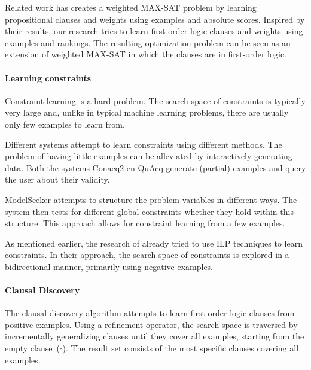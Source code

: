 \documentclass[letterpaper]{article}
\theoremstyle{definition}
\begin{document}
Related work \cite{campigotto2011active} has creates a weighted MAX-SAT problem by learning propositional clauses and weights using examples and absolute scores.
Inspired by their results, our research tries to learn first-order logic clauses and weights using examples and rankings.
The resulting optimization problem can be seen as an extension of weighted MAX-SAT in which the clauses are in first-order logic.

\paragraph{Learning constraints}
Constraint learning is a hard problem.
The search space of constraints is typically very large and, unlike in typical machine learning problems, there are usually only few examples to learn from.

Different systems attempt to learn constraints using different methods.
The problem of having little examples can be alleviated by interactively generating data.
Both the systems Conacq2 \cite{bessiere2007query} en QuAcq \cite{bessiere2013constraint} generate (partial) examples and query the user about their validity.

ModelSeeker \cite{Beldiceanu:ModelSeeker} attempts to structure the problem variables in different ways.
The system then tests for different global constraints whether they hold within this structure.
This approach allows for constraint learning from a few examples.

As mentioned earlier, the research of \cite{Lallouet:LearningCP} already tried to use ILP techniques to learn constraints.
In their approach, the search space of constraints is explored in a bidirectional manner, primarily using negative examples.

\paragraph{Clausal Discovery}
The clausal discovery algorithm \cite{DeRaedt:ClausalDiscovery} attempts to learn first-order logic clauses from positive examples.
Using a refinement operator, the search space is traversed by incrementally generalizing clauses until they cover all examples, starting from the empty clause~($\square$).
The result set consists of the most specific clauses covering all examples.

\end{document}
